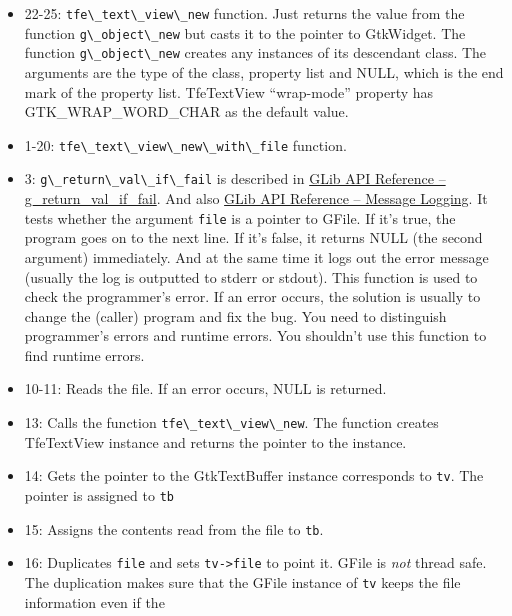 \begin{itemize}
\tightlist
\item
  22-25: \passthrough{\lstinline!tfe\_text\_view\_new!} function. Just
  returns the value from the function
  \passthrough{\lstinline!g\_object\_new!} but casts it to the pointer
  to GtkWidget. The function \passthrough{\lstinline!g\_object\_new!}
  creates any instances of its descendant class. The arguments are the
  type of the class, property list and NULL, which is the end mark of
  the property list. TfeTextView ``wrap-mode'' property has
  GTK\_WRAP\_WORD\_CHAR as the default value.
\item
  1-20: \passthrough{\lstinline!tfe\_text\_view\_new\_with\_file!}
  function.
\item
  3: \passthrough{\lstinline!g\_return\_val\_if\_fail!} is described in
  \href{https://docs.gtk.org/glib/func.return_val_if_fail.html}{GLib API
  Reference -- g\_return\_val\_if\_fail}. And also
  \href{https://docs.gtk.org/glib/logging.html}{GLib API Reference --
  Message Logging}. It tests whether the argument
  \passthrough{\lstinline!file!} is a pointer to GFile. If it's true,
  the program goes on to the next line. If it's false, it returns NULL
  (the second argument) immediately. And at the same time it logs out
  the error message (usually the log is outputted to stderr or stdout).
  This function is used to check the programmer's error. If an error
  occurs, the solution is usually to change the (caller) program and fix
  the bug. You need to distinguish programmer's errors and runtime
  errors. You shouldn't use this function to find runtime errors.
\item
  10-11: Reads the file. If an error occurs, NULL is returned.
\item
  13: Calls the function \passthrough{\lstinline!tfe\_text\_view\_new!}.
  The function creates TfeTextView instance and returns the pointer to
  the instance.
\item
  14: Gets the pointer to the GtkTextBuffer instance corresponds to
  \passthrough{\lstinline!tv!}. The pointer is assigned to
  \passthrough{\lstinline!tb!}
\item
  15: Assigns the contents read from the file to
  \passthrough{\lstinline!tb!}.
\item
  16: Duplicates \passthrough{\lstinline!file!} and sets
  \passthrough{\lstinline!tv->file!} to point it. GFile is \emph{not}
  thread safe. The duplication makes sure that the GFile instance of
  \passthrough{\lstinline!tv!} keeps the file information even if the

\end{itemize}
